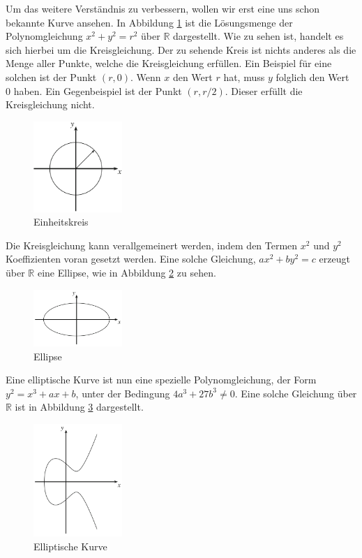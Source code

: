 Um das weitere Verständnis zu verbessern, wollen wir erst eine uns schon bekannte Kurve ansehen. In Abbildung \ref{fig:Einheitskreis} ist die Lösungsmenge der Polynomgleichung $x^2 + y^2 = r^2$ über $\mathbb{R}$ dargestellt. Wie zu sehen ist, handelt es sich hierbei um die Kreisgleichung. Der zu sehende Kreis ist nichts anderes als die Menge aller Punkte, welche die Kreisgleichung erfüllen.
Ein Beispiel für eine solchen ist der Punkt $(r,0)$. Wenn $x$ den Wert $r$ hat, muss $y$ folglich den Wert $0$ haben. Ein Gegenbeispiel ist der Punkt $(r,r/2)$. Dieser erfüllt die Kreisgleichung nicht.
\begin{figure}[!h]
    \centering
    \includegraphics[width=0.3\textwidth]{grafiken/Kreis.PNG}
    \caption{Einheitskreis}
    \label{fig:Einheitskreis}
\end{figure}
Die Kreisgleichung kann verallgemeinert werden, indem den Termen $x^2$ und $y^2$ Koeffizienten voran gesetzt werden. Eine solche Gleichung, $ax^2 + by^2 = c$ erzeugt über $\mathbb{R}$ eine Ellipse, wie in Abbildung \ref{fig:Ellipse} zu sehen.
\begin{figure}[H]
    \centering
    \includegraphics[width=0.3\textwidth]{grafiken/Ellipse.PNG}
    \caption{Ellipse}
    \label{fig:Ellipse}
\end{figure}
Eine elliptische Kurve ist nun eine spezielle Polynomgleichung, der Form $y^2 = x^3 + ax + b$, unter der Bedingung $4a^3 + 27b^3 \neq 0$. Eine solche Gleichung über $\mathbb{R}$ ist in Abbildung \ref{fig:Elliptische_Kurve} dargestellt.
\begin{figure}[!h]
    \centering
    \includegraphics[width=0.3\textwidth]{grafiken/Elliptische_Kurve.PNG}
    \caption{Elliptische Kurve}
    \label{fig:Elliptische_Kurve}
\end{figure}
